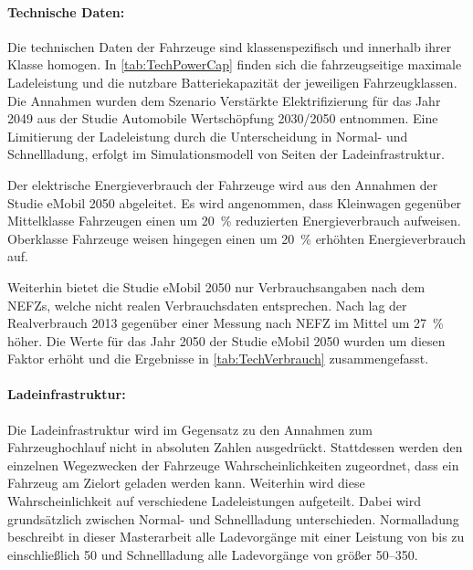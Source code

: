 


\paragraph{Technische Daten:}

Die technischen Daten der Fahrzeuge sind klassenspezifisch und innerhalb ihrer Klasse homogen.
In \autoref{tab:TechPowerCap} finden sich die fahrzeugseitige maximale Ladeleistung und die nutzbare Batteriekapazität der jeweiligen Fahrzeugklassen.
Die Annahmen wurden dem Szenario \glqq Verstärkte Elektrifizierung\grqq{} für das Jahr \num{2049} aus der Studie Automobile Wertschöpfung \num{2030}/\num{2050} \cite{Kaul2019} entnommen.
Eine Limitierung der Ladeleistung durch die Unterscheidung in Normal- und Schnellladung, erfolgt im Simulationsmodell von Seiten der Ladeinfrastruktur.



Der elektrische Energieverbrauch der Fahrzeuge wird aus den Annahmen der Studie \glqq eMobil \num{2050}\grqq{} \cite{Hacker2014} abgeleitet.
Es wird angenommen, dass Kleinwagen gegenüber Mittelklasse Fahrzeugen einen um \SI{20}{\percent} reduzierten Energieverbrauch aufweisen.
Oberklasse Fahrzeuge weisen hingegen einen um \SI{20}{\percent} erhöhten Energieverbrauch auf.\medskip

Weiterhin bietet die Studie \glqq eMobil \num{2050}\grqq{} nur Verbrauchsangaben nach dem \glspl{NEFZ}, welche nicht realen Verbrauchsdaten entsprechen.
Nach \cite{Heinfellner2015} lag der Realverbrauch \num{2013} gegenüber einer Messung nach \gls{NEFZ} im Mittel um \SI{27}{\percent} höher.
Die Werte für das Jahr \num{2050} der Studie \glqq eMobil \num{2050}\grqq{} wurden um diesen Faktor erhöht und die Ergebnisse in \autoref{tab:TechVerbrauch} zusammengefasst.




\paragraph{Ladeinfrastruktur:}

Die Ladeinfrastruktur wird im Gegensatz zu den Annahmen zum Fahrzeughochlauf nicht in absoluten Zahlen ausgedrückt.
Stattdessen werden den einzelnen Wegezwecken der Fahrzeuge Wahrscheinlichkeiten zugeordnet, dass ein Fahrzeug am Zielort geladen werden kann.
Weiterhin wird diese Wahrscheinlichkeit auf verschiedene Ladeleistungen aufgeteilt.
Dabei wird grundsätzlich zwischen Normal- und Schnellladung unterschieden.
Normalladung beschreibt in dieser Masterarbeit alle Ladevorgänge mit einer Leistung von bis zu einschließlich \SI{50}{\kw} und Schnellladung alle Ladevorgänge von größer \SIrange[range-phrase=~bis~einschließlich~]{50}{350}{\kw}.


